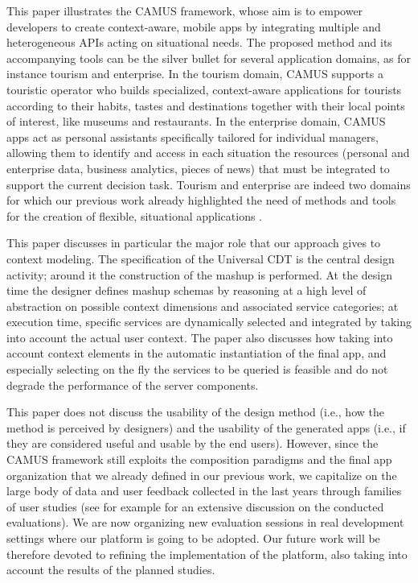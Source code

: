 \label{sec:conclusions}
This paper illustrates the CAMUS framework, whose aim is to empower developers to create context-aware, mobile apps by integrating multiple and heterogeneous APIs acting on situational needs. The  proposed method and its accompanying tools can be the silver bullet for several application domains, as for instance tourism and enterprise. In the tourism domain, CAMUS supports a touristic operator who builds  specialized, context-aware applications for tourists according to their habits, tastes and destinations together with their local points of interest, like museums and restaurants. In the enterprise domain, CAMUS apps act as  personal assistants specifically
tailored for individual managers, allowing them to identify and access in each situation the resources (personal and enterprise data,
business analytics, pieces of news) that must be integrated to support the current decision task. Tourism and enterprise are indeed two domains for which our previous work already highlighted the need of methods and tools for the creation of flexible, situational applications \cite{journals/TWEB2015/CappielloMP15}. 

This paper discusses in particular the major role that our approach gives to context modeling. The specification of the Universal CDT is the central design activity; around it the construction of the mashup is performed. At the design time the designer defines mashup schemas by reasoning at a high level of abstraction on possible context dimensions and associated service categories; at execution time, specific services are dynamically selected and integrated by taking into account the actual user context. The paper also discusses how taking into account context elements in the automatic instantiation of the final app, and especially selecting on the fly the services to be queried is feasible and do not degrade the performance of the server components.

This paper does not discuss the usability of the design method (i.e., how the method is perceived by designers) and the usability of the generated apps (i.e., if they are considered useful and usable by the end users). However, since the CAMUS framework still exploits the composition paradigms and the final app organization that we already defined in our previous work, we capitalize on the large body of data and user feedback collected in the last years through families of user studies (see for example \cite{DBLP:journals/vlc/ArditoCDLMPP14,journals/TWEB2015/CappielloMP15} for an extensive discussion on the conducted evaluations). We are now organizing new evaluation sessions in real development settings where our platform is going to be adopted.
Our future work will be therefore devoted to refining the implementation of the platform, also taking into account the results of the planned studies. 


